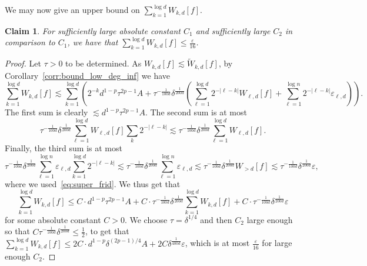 \documentclass[10pt]{article}
\newcommand{\card}[1]{\left\lvert #1\right\rvert}
\newcommand{\eps}{\varepsilon}
\renewcommand{\ll}{\lesssim}
\newtheorem{claim}[thm]{Claim}
\begin{document}
  We may now give an upper bound on $\sum\limits_{k=1}^{\log d} W_{k,d}[f]$.
  \begin{claim}\label{claim:bd_outside_junta}
  For sufficiently large absolute constant $C_1$ and sufficiently large $C_2$ in comparison to $C_1$, we have that
    $\sum\limits_{k=1}^{\log d} W_{k,d}[f]\leq \frac{\eps}{16}$.
  \end{claim}
  \begin{proof}
    Let $\tau>0$ to be determined. As $W_{k,d}[f]\ll \tilde{W}_{k,d}[f]$, by Corollary~\ref{corr:bound_low_deg_inf} we have
    \[
    \sum\limits_{k=1}^{\log d} W_{k,d}[f]
    \ll
    \sum\limits_{k=1}^{\log d}
    \left(2^{-k}d^{1-p}\tau^{2p-1} A
    +\tau^{-\frac{1}{100 d}}\delta^{\frac{1}{200 d}}
    \left(\sum\limits_{\ell=1}^{\log d} 2^{-\card{\ell-k}}W_{\ell,d}[f]+\sum\limits_{\ell=1}^{\log n} 2^{-\card{\ell-k}}\eps_{\ell, d}\right)
    \right).
    \]
    The first sum is clearly $\ll d^{1-p}\tau^{2p-1} A$. The second sum is at most
    \[
    \tau^{-\frac{1}{100 d}}\delta^{\frac{1}{200 d}}
    \sum\limits_{\ell=1}^{\log d}W_{\ell,d}[f] \sum\limits_{k} 2^{-\card{\ell-k}}
    \ll \tau^{-\frac{1}{100 d}}\delta^{\frac{1}{200 d}}\sum\limits_{\ell=1}^{\log d} W_{\ell,d}[f].
    \]
    Finally, the third sum is at most
    \[
    \tau^{-\frac{1}{100 d}}\delta^{\frac{1}{200 d}}
    \sum\limits_{\ell=1}^{\log n} \eps_{\ell, d}
    \sum\limits_{k=1}^{\log d} 2^{-\card{\ell-k}}
    \ll
    \tau^{-\frac{1}{100 d}}\delta^{\frac{1}{200 d}}
    \sum\limits_{\ell=1}^{\log n} \eps_{\ell, d}
    \ll
    \tau^{-\frac{1}{100 d}}\delta^{\frac{1}{200 d}}
    W_{>d}[f]
    \ll \tau^{-\frac{1}{100 d}}\delta^{\frac{1}{200 d}}\eps,
    \]
    where we used~\eqref{eq:super_frid}.
    We thus get that
    \[
    \sum\limits_{k=1}^{\log d} W_{k,d}[f]
    \leq
    C\cdot d^{1-p}\tau^{2p-1} A
    +C\cdot \tau^{-\frac{1}{100 d}}\delta^{\frac{1}{200 d}}\sum\limits_{k=1}^{\log d} W_{k,d}[f]
    +C\cdot \tau^{-\frac{1}{100 d}}\delta^{\frac{1}{200 d}}\eps
    \]
    for some absolute constant $C>0$. We choose $\tau = \delta^{1/4}$ and then $C_2$ large enough so that
    $C\tau^{-\frac{1}{100 d}}\delta^{\frac{1}{200 d}}\leq \frac{1}{2}$, to get that
    $\sum\limits_{k=1}^{\log d} W_{k,d}[f]\leq 2C\cdot d^{1-p}\delta^{(2p-1)/4} A + 2C\delta^{\frac{1}{400 d}}\eps$,
    which is at most $\frac{\eps}{16}$ for large enough $C_2$.
  \end{proof}
\end{document}
